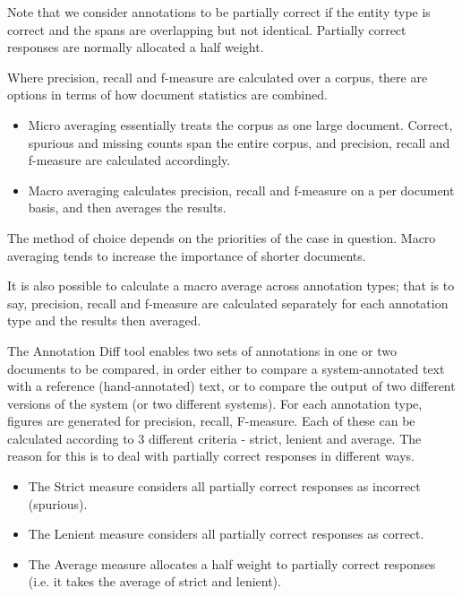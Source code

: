 Note that we consider annotations to be partially correct if the
entity type is correct and the spans are overlapping but not
identical. Partially correct responses are normally allocated a half
weight.


Where precision, recall and f-measure are calculated over a corpus, there are
options in terms of how document statistics are combined.

\begin{itemize}
  \item Micro averaging essentially treats the corpus as one large document.
  Correct, spurious and missing counts span the entire corpus, and precision,
  recall and f-measure are calculated accordingly.
  \item Macro averaging calculates precision, recall and f-measure on a per
  document basis, and then averages the results.
\end{itemize}

The method of choice depends on the priorities of the case in question. Macro
averaging tends to increase the importance of shorter documents.

It is also possible to calculate a macro average across annotation types; that
is to say, precision, recall and f-measure are calculated separately for each
annotation type and the results then averaged.


The Annotation Diff tool enables two sets of annotations in one or two
documents to be compared, in order either to compare a system-annotated
text with a reference (hand-annotated) text, or to compare the output
of two different versions of the system (or two different
systems). For each annotation type, figures are generated for
precision, recall, F-measure.
Each of these can be calculated according to 3 different
criteria - strict, lenient and average. The reason for this is to deal
with partially correct responses in different ways.
\begin{itemize}
\item The Strict measure considers all partially correct
responses as incorrect (spurious).
\item The Lenient measure considers all partially correct
responses as correct.
\item The Average measure allocates a half weight to
partially correct responses (i.e. it takes the average of strict
and lenient).
\end{itemize}


